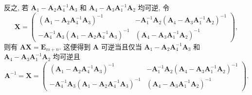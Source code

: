 \documentclass[../../main.tex]{subfiles}%
\begin{document}
\begin{solution}
反之, 若 \(\boldsymbol{A}_1 - \boldsymbol{A}_2\boldsymbol{A}_4^{-1}\boldsymbol{A}_3\) 和 \(\boldsymbol{A}_4 - \boldsymbol{A}_3\boldsymbol{A}_1^{-1}\boldsymbol{A}_2\) 均可逆, 令
\[
\boldsymbol{X} = \begin{pmatrix} (\boldsymbol{A}_1 - \boldsymbol{A}_2\boldsymbol{A}_4^{-1}\boldsymbol{A}_3)^{-1} & -\boldsymbol{A}_1^{-1}\boldsymbol{A}_2(\boldsymbol{A}_4 - \boldsymbol{A}_3\boldsymbol{A}_1^{-1}\boldsymbol{A}_2)^{-1} \\ -\boldsymbol{A}_4^{-1}\boldsymbol{A}_3(\boldsymbol{A}_1 - \boldsymbol{A}_2\boldsymbol{A}_4^{-1}\boldsymbol{A}_3)^{-1} & (\boldsymbol{A}_4 - \boldsymbol{A}_3\boldsymbol{A}_1^{-1}\boldsymbol{A}_2)^{-1} \end{pmatrix},
\]
则有 \(\boldsymbol{A}\boldsymbol{X} = \boldsymbol{E}_{m + n}\). 这便得到 \(\boldsymbol{A}\) 可逆当且仅当 \(\boldsymbol{A}_1 - \boldsymbol{A}_2\boldsymbol{A}_4^{-1}\boldsymbol{A}_3\) 和 \(\boldsymbol{A}_4 - \boldsymbol{A}_3\boldsymbol{A}_1^{-1}\boldsymbol{A}_2\) 均可逆且
\[
\boldsymbol{A}^{-1} = \boldsymbol{X} = \begin{pmatrix} (\boldsymbol{A}_1 - \boldsymbol{A}_2\boldsymbol{A}_4^{-1}\boldsymbol{A}_3)^{-1} & -\boldsymbol{A}_1^{-1}\boldsymbol{A}_2(\boldsymbol{A}_4 - \boldsymbol{A}_3\boldsymbol{A}_1^{-1}\boldsymbol{A}_2)^{-1} \\ -\boldsymbol{A}_4^{-1}\boldsymbol{A}_3(\boldsymbol{A}_1 - \boldsymbol{A}_2\boldsymbol{A}_4^{-1}\boldsymbol{A}_3)^{-1} & (\boldsymbol{A}_4 - \boldsymbol{A}_3\boldsymbol{A}_1^{-1}\boldsymbol{A}_2)^{-1} \end{pmatrix}.
\]


\end{solution}
\end{document}
